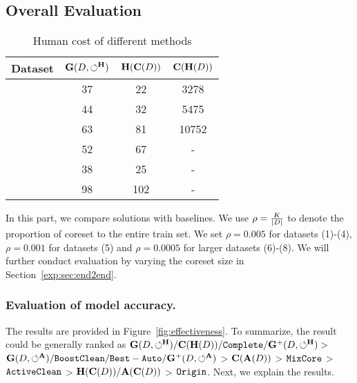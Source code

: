 


\subsection{Overall Evaluation}\label{exp:sec:overall}

\begin{table}
	\centering
	\caption{Human cost of different methods}
	\vspace{-1.2em}
	\small
	\begin{tabular}{cccc}
		\hline
		Dataset & $\mathbf{G}(D,\circlearrowleft^\mathbf{H})$ & $\mathbf{H}(\mathbf{C}(D))$ & $\mathbf{C}(\mathbf{H}(D))$\\
		\hline
		\nursery & 37 & 22 & 3278\\
		\hr & 44 & 32 & 5475\\
		\adult & 63 & 81 & 10752\\
		\credit & 52 & 67 & -\\
		\bike & 38 & 25 & -\\
		\air & 98 & 102 & -\\
		\hline
	\end{tabular}
	\label{tbl:humancost}
	\vspace{-1em}
\end{table}





In this part, we compare \ours solutions with baselines. We use $\rho = \frac{K}{|D|}$ to denote the proportion of coreset  to the entire train set.  %
We set  $\rho=0.005$ for datasets (1)-(4), $\rho=0.001$ for datasets (5) and  $\rho=0.0005$ for larger datasets (6)-(8).
 We  will further  conduct evaluation by varying the coreset size  in Section~\ref{exp:sec:end2end}.









\subsubsection{Evaluation of model accuracy.}
The results are provided in Figure~\ref{fig:effectiveness}. To summarize, the result could be generally ranked as $\mathbf{G}(D,\circlearrowleft^\mathbf{H})/\mathbf{C}(\mathbf{H}(D))/{\tt Complete}/\mathbf{G}^+(D,\circlearrowleft^\mathbf{H}) > $ $\mathbf{G}(D,\circlearrowleft^\mathbf{A})/{\tt BoostClean} /{\tt Best-Auto} /\mathbf{G}^+(D,\circlearrowleft^\mathbf{A})$ > $\mathbf{C}(\mathbf{A}(D))$ > ${\tt MixCore}$ > ${\tt ActiveClean}$ > $\mathbf{H}(\mathbf{C}(D))/\mathbf{A}(\mathbf{C}(D))$ > ${\tt Origin}$.
Next, we explain the results.

